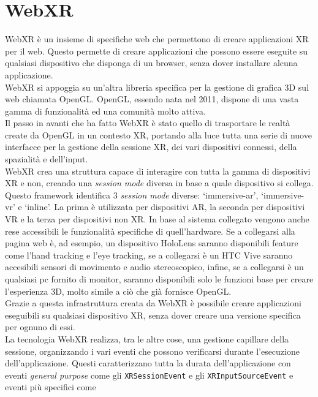 \section{WebXR}\label{sec:WebXR}
WebXR è un insieme di specifiche web che permettono di creare applicazioni XR per il web. Questo permette di creare applicazioni che possono essere eseguite su qualsiasi dispositivo
che disponga di un browser, senza dover installare alcuna applicazione\cite{WebXR}.\\
WebXR si appoggia su un'altra libreria specifica per la gestione di grafica 3D sul web chiamata OpenGL. OpenGL, essendo nata nel 2011, dispone di una vasta gamma di funzionalità
ed una comunità molto attiva.\\
Il passo in avanti che ha fatto WebXR è stato quello di trasportare le realtà create da OpenGL in un contesto XR, portando alla luce tutta una serie di nuove interfacce per la gestione
della sessione XR, dei vari dispositivi connessi, della spazialità e dell'input.\\
WebXR crea una struttura capace di interagire con tutta la gamma di dispositivi XR e non, creando una \textit{session mode} diversa in base a quale dispositivo si collega. Questo
framework identifica 3 \textit{session mode} diverse: `immersive-ar', `immersive-vr' e `inline'. La prima è utilizzata per dispositivi AR, la seconda per dispositivi VR e la terza
per dispositivi non XR. In base al sistema collegato vengono anche rese accessibili le funzionalità specifiche di quell'hardware. Se a collegarsi alla pagina web è, ad esempio, un 
dispositivo HoloLens saranno disponibili feature come l'hand tracking e l'eye tracking, se a collegarsi è un HTC Vive saranno accesibili sensori di movimento e audio stereoscopico, 
infine, se a collegarsi è un qualsiasi pc fornito di monitor, saranno disponibili solo le funzioni base per creare l'esperienza 3D, molto simile a ciò che già fornisce OpenGL.\\
Grazie a questa infrastruttura creata da WebXR è possibile creare applicazioni eseguibili su qualsiasi dispositivo XR, senza dover creare una versione specifica per ognuno di essi.\\
\newline
La tecnologia WebXR realizza, tra le altre cose, una gestione capillare della sessione, organizzando i vari eventi che possono verificarsi durante l'esecuzione dell'applicazione. Questi
caratterizzano tutta la durata dell'applicazione con eventi \textit{general purpose} come gli \texttt{XRSessionEvent} e gli \texttt{XRInputSourceEvent} e eventi più specifici come
